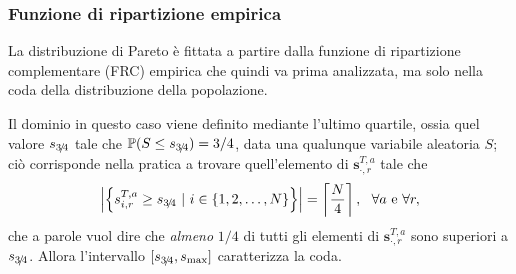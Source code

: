            \subsubsection{Funzione di ripartizione empirica}\label{secFRCEmpirica}

                La distribuzione di Pareto è fittata a partire dalla funzione di ripartizione complementare (FRC) empirica che quindi va prima analizzata, ma solo nella coda della distribuzione della popolazione.
                
                Il dominio in questo caso viene definito mediante l'ultimo quartile, ossia quel valore \(s_{3\hspace{-0.15em}/\hspace{-0.15em}4}\) tale che \(\mathbb P(S\leq s_{3\hspace{-0.15em}/\hspace{-0.15em}4})=3/4\), data una qualunque variabile aleatoria \(S\); ciò corrisponde nella pratica a trovare quell'elemento di \(\mathbf s^{T,a}_{\cdot,r}\) tale che
                \begin{equation*}
                    \left\vert\left\{
                        s^{T,a}_{i,r}\geq s_\TreQuarti\ |\ i\in\{1,2,\ldots,N\}
                    \right\}\right\vert=\left\lceil\frac N4\right\rceil,
                    \ \ \forall a\text{ e }\forall r,
                \end{equation*}
                che a parole vuol dire che \textit{almeno} \(1/4\) di tutti gli elementi di \(\mathbf s^{T,a}_{\cdot,r}\) sono superiori a \(s_{3\hspace{-0.15em}/\hspace{-0.15em}4}\). %
                Allora l'intervallo \([s_{3\hspace{-0.15em}/\hspace{-0.15em}4},s_{\max}]\) caratterizza la coda.

